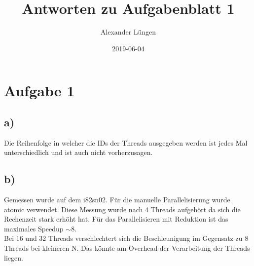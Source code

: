 \documentclass{article}
\title{Antworten zu Aufgabenblatt 1}
\date{2019-06-04}
\author{Alexander Lüngen}
\begin{document}
    \maketitle
    \newpage
    \section{Aufgabe 1}
        \subsection{a)}
        Die Reihenfolge in welcher die IDs der Threads ausgegeben werden ist jedes Mal unterschiedlich und ist auch nicht vorherzusagen.
        
        \subsection{b)}
        Gemessen wurde auf dem i82sn02. Für die manuelle Parallelisierung wurde atomic verwendet. Diese Messung wurde nach 4 Threads aufgehört da sich die Rechenzeit stark erhöht hat. Für das Parallelisieren mit Reduktion ist das maximales Speedup $ \sim 8 $.\\
        Bei 16 und 32 Threads verschlechtert sich die Beschleunigung im Gegensatz zu 8 Threads bei kleineren N. Das könnte am Overhead der Verarbeitung der Threads liegen.
        
\end{document}
